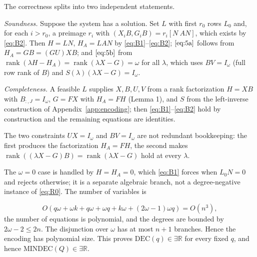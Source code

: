 \documentclass[journal]{IEEEtran}
\theoremstyle{plainn}
\begin{document}
The correctness splits into two independent statements.

\emph{Soundness.} Suppose the system has a solution. Set $L$ with first $r_0$ rows $L_0$ and, for each $i>r_0$, a preimage $r_i$ with $(X_iB,G_iB)=r_i[N\ AN]$, which exists by \eqref{eq:B2}. Then $H=LN$, $H_A=LAN$ by \eqref{eq:B1}--\eqref{eq:B2}; $\eqref{eq:5a}$ follows from $H_A=GB=(GU)XB$; and $\eqref{eq:5b}$ from $\operatorname{rank}(\lambda H-H_A)=\operatorname{rank}(\lambda X-G)=\omega$ for all $\lambda$, which uses $BV=I_\omega$ (full row rank of $B$) and $S(\lambda)(\lambda X-G)=I_\omega$.

\emph{Completeness.} A feasible $L$ supplies $X,B,U,V$ from a rank factorization $H=XB$ with $B_{:,J}=I_\omega$, $G=FX$ with $H_A=FH$ (Lemma 1), and $S$ from the left-inverse construction of Appendix~\ref{app:encoding}; then \eqref{eq:B1}--\eqref{eq:B2} hold by construction and the remaining equations are identities.

The two constraints $UX=I_\omega$ and $BV=I_\omega$ are not redundant bookkeeping: the first produces the factorization $H_A=FH$, the second makes $\operatorname{rank}((\lambda X-G)B)=\operatorname{rank}(\lambda X-G)$ hold at every $\lambda$.

The $\omega=0$ case is handled by $H=H_A=0$, which \eqref{eq:B1} forces when $L_0N=0$ and rejects otherwise; it is a separate algebraic branch, not a degree-negative instance of \eqref{eq:R0}. The number of variables is

\begin{equation}
O(q\omega+\omega k+q\omega+\omega q+k\omega+(2\omega-1)\omega q)
=O(n^3),
\end{equation}
the number of equations is polynomial, and the degrees are bounded by $2\omega-2\le2n$. The disjunction over $\omega$ has at most $n+1$ branches. Hence the encoding has polynomial size. This proves $\mathrm{DEC}(q)\in\exists\mathbb R$ for every fixed $q$, and hence $\mathrm{MINDEC}(Q)\in\exists\mathbb R$.
\end{document}
